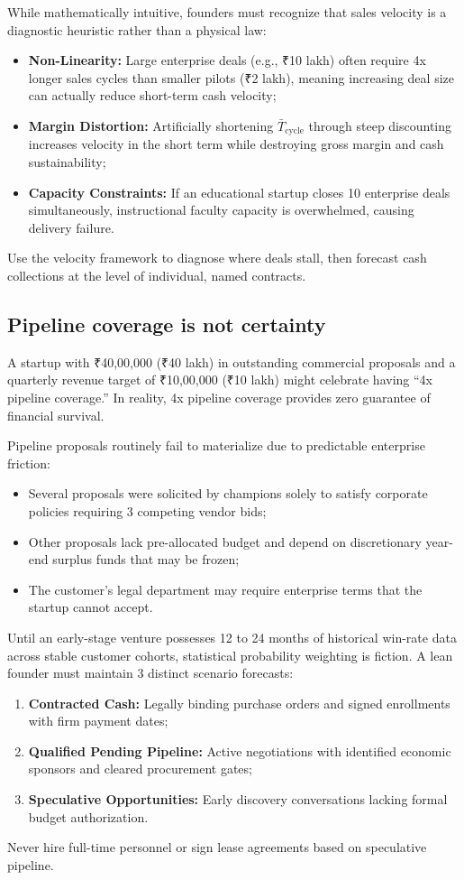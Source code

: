 While mathematically intuitive, founders must recognize that sales velocity is a diagnostic heuristic rather than a physical law:
\begin{itemize}
\item \textbf{Non-Linearity:} Large enterprise deals (e.g., ₹10 lakh) often require 4x longer sales cycles than smaller pilots (₹2 lakh), meaning increasing deal size can actually reduce short-term cash velocity;
\item \textbf{Margin Distortion:} Artificially shortening $\bar{T}_{\text{cycle}}$ through steep discounting increases velocity in the short term while destroying gross margin and cash sustainability;
\item \textbf{Capacity Constraints:} If an educational startup closes 10 enterprise deals simultaneously, instructional faculty capacity is overwhelmed, causing delivery failure.
\end{itemize}
Use the velocity framework to diagnose where deals stall, then forecast cash collections at the level of individual, named contracts.

\subsection{Pipeline coverage is not certainty}

A startup with ₹40,00,000 (₹40 lakh) in outstanding commercial proposals and a quarterly revenue target of ₹10,00,000 (₹10 lakh) might celebrate having ``4x pipeline coverage.'' In reality, 4x pipeline coverage provides zero guarantee of financial survival.

Pipeline proposals routinely fail to materialize due to predictable enterprise friction:
\begin{itemize}
\item Several proposals were solicited by champions solely to satisfy corporate policies requiring 3 competing vendor bids;
\item Other proposals lack pre-allocated budget and depend on discretionary year-end surplus funds that may be frozen;
\item The customer's legal department may require enterprise terms that the startup cannot accept.
\end{itemize}
Until an early-stage venture possesses 12 to 24 months of historical win-rate data across stable customer cohorts, statistical probability weighting is fiction. A lean founder must maintain 3 distinct scenario forecasts:
\begin{enumerate}
\item \textbf{Contracted Cash:} Legally binding purchase orders and signed enrollments with firm payment dates;
\item \textbf{Qualified Pending Pipeline:} Active negotiations with identified economic sponsors and cleared procurement gates;
\item \textbf{Speculative Opportunities:} Early discovery conversations lacking formal budget authorization.
\end{enumerate}
Never hire full-time personnel or sign lease agreements based on speculative pipeline.

